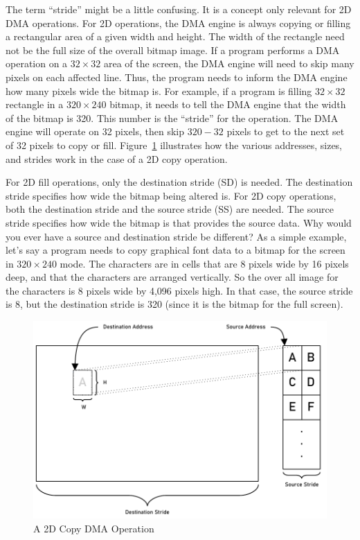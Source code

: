 The term ``stride'' might be a little confusing. It is a concept only relevant for 2D DMA operations. For 2D operations, the DMA engine is always copying or filling a rectangular area of a given width and height. The width of the rectangle need not be the full size of the overall bitmap image. If a program performs a DMA operation on a $32 \times 32$ area of the screen, the DMA engine will need to skip many pixels on each affected line. Thus, the program needs to inform the DMA engine how many pixels wide the bitmap is. For example, if a program is filling $32 \times 32$ rectangle in a $320 \times 240$ bitmap, it needs to tell the DMA engine that the width of the bitmap is 320. This number is the ``stride'' for the operation. The DMA engine will operate on 32 pixels, then skip $320 - 32$ pixels to get to the next set of 32 pixels to copy or fill. Figure~\ref{fig:dma_2d} illustrates how the various addresses, sizes, and strides work in the case of a 2D copy operation.

For 2D fill operations, only the destination stride (SD) is needed. The destination stride specifies how wide the bitmap being altered is. For 2D copy operations, both the destination stride and the source stride (SS) are needed. The source stride specifies how wide the bitmap is that provides the source data. Why would you ever have a source and destination stride be different? As a simple example, let's say a program needs to copy graphical font data to a bitmap for the screen in $320 \times 240$ mode. The characters are in cells that are 8 pixels wide by 16 pixels deep, and that the characters are arranged vertically. So the over all image for the characters is 8 pixels wide by 4,096 pixels high. In that case, the source stride is 8, but the destination stride is 320 (since it is the bitmap for the full screen).

\begin{figure}[ht]
    \begin{center}
        \includegraphics[scale=0.75]{images/f256_dma_2d.pdf}
    \end{center}
    \caption{A 2D Copy DMA Operation}
    \label{fig:dma_2d}
\end{figure}


